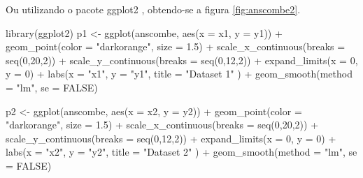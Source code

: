 \documentclass[
	12pt,				%
	oneside,			%
	a4paper,			%
	chapter=TITLE,		%
	section=TITLE,		%
	english,			%
	brazil				%
	]{abntex2}
\newcommand{\pkg}[1]{{\normalfont\fontseries{b}\selectfont #1}}
\newenvironment{Shaded}{\begin{snugshade}}{\end{snugshade}}
\newcommand{\AttributeTok}[1]{\textcolor[rgb]{0.77,0.63,0.00}{#1}}
\newcommand{\ConstantTok}[1]{\textcolor[rgb]{0.00,0.00,0.00}{#1}}
\newcommand{\DecValTok}[1]{\textcolor[rgb]{0.00,0.00,0.81}{#1}}
\newcommand{\FloatTok}[1]{\textcolor[rgb]{0.00,0.00,0.81}{#1}}
\newcommand{\FunctionTok}[1]{\textcolor[rgb]{0.00,0.00,0.00}{#1}}
\newcommand{\NormalTok}[1]{#1}
\newcommand{\OtherTok}[1]{\textcolor[rgb]{0.56,0.35,0.01}{#1}}
\newcommand{\SpecialCharTok}[1]{\textcolor[rgb]{0.00,0.00,0.00}{#1}}
\newcommand{\StringTok}[1]{\textcolor[rgb]{0.31,0.60,0.02}{#1}}
\begin{document}
Ou utilizando o pacote \pkg{ggplot2} \autocite*{R-ggplot2}, obtendo-se a figura \ref{fig:anscombe2}.
\begin{Shaded}
\begin{Highlighting}[]
\FunctionTok{library}\NormalTok{(ggplot2)}
\NormalTok{p1 }\OtherTok{\textless{}{-}} \FunctionTok{ggplot}\NormalTok{(anscombe, }\FunctionTok{aes}\NormalTok{(}\AttributeTok{x =}\NormalTok{ x1, }\AttributeTok{y =}\NormalTok{ y1)) }\SpecialCharTok{+}
  \FunctionTok{geom\_point}\NormalTok{(}\AttributeTok{color =} \StringTok{"darkorange"}\NormalTok{, }\AttributeTok{size =} \FloatTok{1.5}\NormalTok{) }\SpecialCharTok{+}
  \FunctionTok{scale\_x\_continuous}\NormalTok{(}\AttributeTok{breaks =} \FunctionTok{seq}\NormalTok{(}\DecValTok{0}\NormalTok{,}\DecValTok{20}\NormalTok{,}\DecValTok{2}\NormalTok{)) }\SpecialCharTok{+}
  \FunctionTok{scale\_y\_continuous}\NormalTok{(}\AttributeTok{breaks =} \FunctionTok{seq}\NormalTok{(}\DecValTok{0}\NormalTok{,}\DecValTok{12}\NormalTok{,}\DecValTok{2}\NormalTok{)) }\SpecialCharTok{+}
  \FunctionTok{expand\_limits}\NormalTok{(}\AttributeTok{x =} \DecValTok{0}\NormalTok{, }\AttributeTok{y =} \DecValTok{0}\NormalTok{) }\SpecialCharTok{+}
  \FunctionTok{labs}\NormalTok{(}\AttributeTok{x =} \StringTok{"x1"}\NormalTok{, }\AttributeTok{y =} \StringTok{"y1"}\NormalTok{,}
       \AttributeTok{title =} \StringTok{"Dataset 1"}\NormalTok{ ) }\SpecialCharTok{+}
  \FunctionTok{geom\_smooth}\NormalTok{(}\AttributeTok{method =} \StringTok{"lm"}\NormalTok{, }\AttributeTok{se =} \ConstantTok{FALSE}\NormalTok{)}

\NormalTok{p2 }\OtherTok{\textless{}{-}} \FunctionTok{ggplot}\NormalTok{(anscombe, }\FunctionTok{aes}\NormalTok{(}\AttributeTok{x =}\NormalTok{ x2, }\AttributeTok{y =}\NormalTok{ y2)) }\SpecialCharTok{+}
  \FunctionTok{geom\_point}\NormalTok{(}\AttributeTok{color =} \StringTok{"darkorange"}\NormalTok{, }\AttributeTok{size =} \FloatTok{1.5}\NormalTok{) }\SpecialCharTok{+}
  \FunctionTok{scale\_x\_continuous}\NormalTok{(}\AttributeTok{breaks =} \FunctionTok{seq}\NormalTok{(}\DecValTok{0}\NormalTok{,}\DecValTok{20}\NormalTok{,}\DecValTok{2}\NormalTok{)) }\SpecialCharTok{+}
  \FunctionTok{scale\_y\_continuous}\NormalTok{(}\AttributeTok{breaks =} \FunctionTok{seq}\NormalTok{(}\DecValTok{0}\NormalTok{,}\DecValTok{12}\NormalTok{,}\DecValTok{2}\NormalTok{)) }\SpecialCharTok{+}
  \FunctionTok{expand\_limits}\NormalTok{(}\AttributeTok{x =} \DecValTok{0}\NormalTok{, }\AttributeTok{y =} \DecValTok{0}\NormalTok{) }\SpecialCharTok{+}
  \FunctionTok{labs}\NormalTok{(}\AttributeTok{x =} \StringTok{"x2"}\NormalTok{, }\AttributeTok{y =} \StringTok{"y2"}\NormalTok{,}
       \AttributeTok{title =} \StringTok{"Dataset 2"}\NormalTok{ ) }\SpecialCharTok{+}
  \FunctionTok{geom\_smooth}\NormalTok{(}\AttributeTok{method =} \StringTok{"lm"}\NormalTok{, }\AttributeTok{se =} \ConstantTok{FALSE}\NormalTok{)}


\end{Highlighting}
\end{Shaded}
\end{document}
